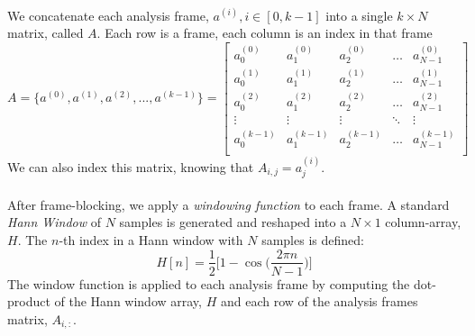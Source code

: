 \documentclass[12pt,letterpaper]{article}
\begin{document}
\paragraph*{}We concatenate each analysis frame, $a^{(i)}, i \in [0,k-1]$ into a single $k \times N$ matrix, called $A$. Each row is a frame, each column is an index in that frame
\begin{equation}
\label{eqn-FrameMatrix}
A = \big\{ a^{(0)} , a^{(1)} , a^{(2)} , ... , a^{(k-1)} \big\} = 
\begin{bmatrix}
a^{(0)}_{0} & a^{(0)}_{1} & a^{(0)}_{2} & \hdots & a^{(0)}_{N-1} \\
a^{(1)}_{0} & a^{(1)}_{1} & a^{(1)}_{2} & \hdots & a^{(1)}_{N-1} \\
a^{(2)}_{0} & a^{(2)}_{1} & a^{(2)}_{2} & \hdots & a^{(2)}_{N-1} \\
\vdots 		& \vdots 	  & \vdots 		& \ddots & \vdots        \\
a^{(k-1)}_{0} & a^{(k-1)}_{1} & a^{(k-1)}_{2} & \hdots & a^{(k-1)}_{N-1} \\
\end{bmatrix}
\end{equation}
We can also index this matrix, knowing that $A_{i,j} = a^{(i)}_{j}$.

\paragraph*{}After frame-blocking, we apply a \textit{windowing function} to each frame. A standard \textit{Hann Window} of $N$ samples is generated and reshaped into a $N \times 1$ column-array,$H$. The $n$-th index in a Hann window with $N$ samples is defined:
\begin{equation}
\label{eqn-Hann}
H[n] = \frac{1}{2}\bigg[ 1 - \cos\Big( \frac{2\pi n}{N-1}\Big)\bigg]
\end{equation}
The window function is applied to each analysis frame by computing the dot-product of the Hann window array, $H$ and each row of the analysis frames matrix, $A_{i,:}$.
\end{document}
